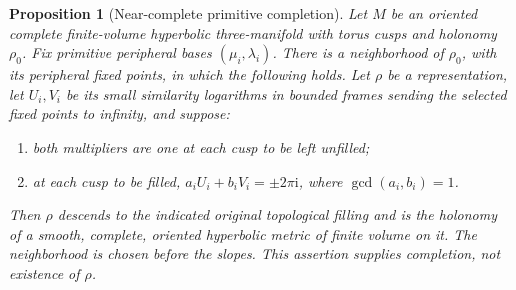 \documentclass[11pt]{article}
\numberwithin{equation}{section}
\newtheorem{proposition}[theorem]{Proposition}
\theoremstyle{definition}
\theoremstyle{remark}
\newcommand{\ii}{\mathrm i}
\begin{document}
\begin{proposition}[Near-complete primitive completion]\label{mf:completion-prop}
Let \(M\) be an oriented complete finite-volume hyperbolic
three-manifold with torus cusps and holonomy \(\rho_0\).
Fix primitive peripheral bases \((\mu_i,\lambda_i)\).
There is a neighborhood of \(\rho_0\), with its peripheral fixed
points, in which the following holds.
Let \(\rho\) be a representation, let \(U_i,V_i\) be its
small similarity logarithms in bounded frames sending the selected
fixed points to infinity, and suppose:
\begin{enumerate}[label=(\alph*)]
\item both multipliers are one at each cusp to be left unfilled;
\item at each cusp to be filled,
\(a_iU_i+b_iV_i=\pm2\pi\ii\), where \(\gcd(a_i,b_i)=1\).
\end{enumerate}
Then \(\rho\) descends to the indicated original topological filling
and is the holonomy of a smooth, complete, oriented hyperbolic metric
of finite volume on it. The neighborhood is chosen before the slopes.
This assertion supplies completion, not existence of \(\rho\).
\end{proposition}
\end{document}
